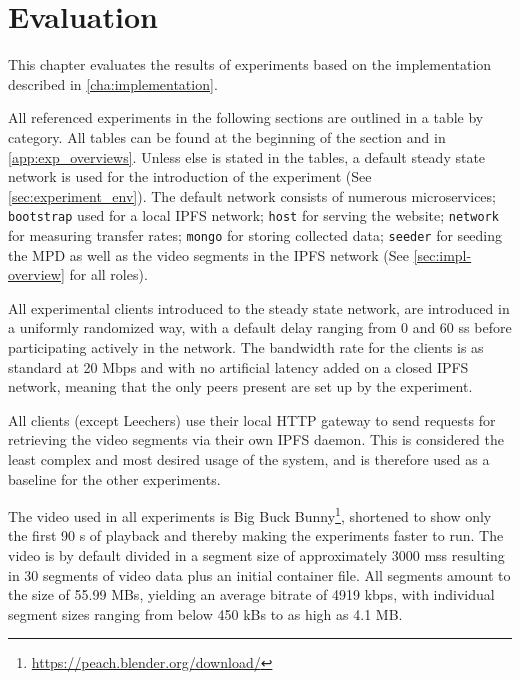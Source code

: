 \chapter{Evaluation}
\label{cha:evaluation}
This chapter evaluates the results of experiments based on the implementation described in \autoref{cha:implementation}.

All referenced experiments in the following sections are outlined in a table by category. All tables can be found at the beginning of the section and in \autoref{app:exp_overviews}. Unless else is stated in the tables, a default steady state network is used for the introduction of the experiment (See \autoref{sec:experiment_env}). The default network consists of numerous microservices; \texttt{bootstrap} used for a local \ac{IPFS} network; \texttt{host} for serving the website; \texttt{network} for measuring transfer rates; \texttt{mongo} for storing collected data; \texttt{seeder} for seeding the \ac{MPD} as well as the video segments in the \ac{IPFS} network (See \autoref{sec:impl-overview} for all roles).

All experimental clients introduced to the steady state network, are introduced in a uniformly randomized way, with a default delay ranging from 0 and 60 \acp{s} before participating actively in the network.
The bandwidth rate for the clients is as standard at 20 \ac{Mbps} and with no artificial latency added on a closed \ac{IPFS} network, meaning that the only peers present are set up by the experiment.

All clients (except Leechers) use their local \ac{HTTP} gateway to send requests for retrieving the video segments via their own \ac{IPFS} daemon. This is considered the least complex and most desired usage of the system, and is therefore used as a baseline for the other experiments.

The video used in all experiments is Big Buck Bunny\footnote{\url{https://peach.blender.org/download/}}, shortened to show only the first 90 \ac{s} of playback and thereby making the experiments faster to run. The video is by default divided in a segment size of approximately 3000 \acp{ms} resulting in 30 segments of video data plus an initial container file. All segments amount to the size of 55.99 \acp{MB}, yielding an average bitrate of 4919 \ac{kbps}, with individual segment sizes ranging from below 450 \acp{kB} to as high as 4.1 \ac{MB}.


